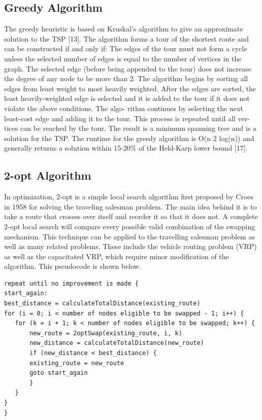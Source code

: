 \documentclass[10pt,twocolumn,letterpaper]{article}
\begin{document}
\subsection{Greedy Algorithm}
The greedy heuristic is based on Kruskal’s algorithm to
give an approximate solution to the TSP [13]. The algorithm
forms a tour of the shortest route and can be constructed if
and only if:
The edges of the tour must not form a cycle unless
the selected number of edges is equal to the number of
vertices in the graph.
The selected edge (before being appended to the tour)
does not increase the degree of any node to be more
than 2.
The algorithm begins by sorting all edges from least weight
to most heavily weighted. After the edges are sorted, the
least heavily-weighted edge is selected and it is added to the
tour if it does not violate the above conditions. The algo-
rithm continues by selecting the next least-cost edge and
adding it to the tour. This process is repeated until all ver-
tices can be reached by the tour. The result is a minimum
spanning tree and is a solution for the TSP. The runtime for
the greedy algorithm is O(n 2 log(n)) and generally returns a
solution within 15-20\% of the Held-Karp lower bound [17].

\subsection{2-opt Algorithm}
In optimization, 2-opt is a simple local search algorithm first proposed
by Croes in 1958 for solving the traveling salesman problem\cite{croes1958method}.
The main idea behind it is to take a route that crosses over itself and reorder it so that it does not.
A complete 2-opt local search will compare every possible valid combination of the swapping mechanism. This technique can be applied to the travelling salesman problem as well as many related problems. These include the vehicle routing problem (VRP) as well as the capacitated VRP, which require minor modification of the algorithm.
This pseudocode is shown below.
\begin{lstlisting}
repeat until no improvement is made {
start_again:
best_distance = calculateTotalDistance(existing_route)
for (i = 0; i < number of nodes eligible to be swapped - 1; i++) {
   for (k = i + 1; k < number of nodes eligible to be swapped; k++) {
       new_route = 2optSwap(existing_route, i, k)
       new_distance = calculateTotalDistance(new_route)
       if (new_distance < best_distance) {
	   existing_route = new_route
	   goto start_again
       }
   }
}
}
\end{lstlisting}
\end{document}
